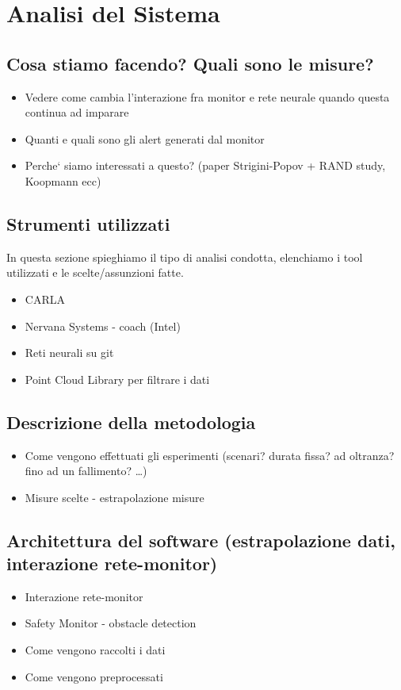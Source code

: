 \chapter{Analisi del Sistema}


\section{Cosa stiamo facendo? Quali sono le misure?}

\begin{itemize}
	
	\item Vedere come cambia l'interazione fra monitor e rete neurale quando questa continua ad imparare
	\item Quanti e quali sono gli alert generati dal monitor
	\item Perche` siamo interessati a questo? (paper Strigini-Popov + RAND study, Koopmann ecc)
	
\end{itemize}


\section{Strumenti utilizzati}

In questa sezione spieghiamo il tipo di analisi condotta, elenchiamo i tool utilizzati e le scelte/assunzioni fatte.\newline


\begin{itemize}
	\item CARLA
	\item Nervana Systems - coach (Intel)
	\item Reti neurali su git
	\item Point Cloud Library per filtrare i dati
\end{itemize}

\section{Descrizione della metodologia}

\begin{itemize}
	
	\item Come vengono effettuati gli esperimenti (scenari? durata fissa? ad oltranza? fino ad un fallimento? \dots)
	\item Misure scelte - estrapolazione misure
	
\end{itemize}

\section{Architettura del software (estrapolazione dati, interazione rete-monitor)}

\begin{itemize}
	
	
	\item Interazione rete-monitor
	\item Safety Monitor - obstacle detection
	\item Come vengono raccolti i dati
	\item Come vengono preprocessati
	
\end{itemize}

